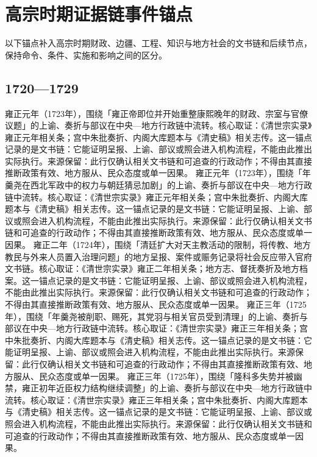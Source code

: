 \section{高宗时期证据链事件锚点}
以下锚点补入高宗时期财政、边疆、工程、知识与地方社会的文书链和后续节点，保持命令、条件、实施和影响之间的区分。
\subsection{1720—1729}
雍正元年（1723年），围绕「雍正帝即位并开始重整康熙晚年的财政、宗室与官僚议题」的上谕、奏折与部议在中央—地方行政链中流转。核心取证：《清世宗实录》雍正元年相关条；宫中朱批奏折、内阁大库题本与《清史稿》相关志传。这一锚点记录的是文书链：它能证明呈报、上谕、部议或照会进入机构流程，不能由此推出实际执行。来源保留：此行仅确认相关文书链和可追查的行政动作；不得由其直接推断政策有效、地方服从、民众态度或单一因果。
雍正元年（1723年），围绕「年羹尧在西北军政中的权力与朝廷猜忌加剧」的上谕、奏折与部议在中央—地方行政链中流转。核心取证：《清世宗实录》雍正元年相关条；宫中朱批奏折、内阁大库题本与《清史稿》相关志传。这一锚点记录的是文书链：它能证明呈报、上谕、部议或照会进入机构流程，不能由此推出实际执行。来源保留：此行仅确认相关文书链和可追查的行政动作；不得由其直接推断政策有效、地方服从、民众态度或单一因果。
雍正二年（1724年），围绕「清廷扩大对天主教活动的限制，将传教、地方教民与外来人员置入治理问题」的地方呈报、案件或赈务记录将社会反应带入官府文书链。核心取证：《清世宗实录》雍正二年相关条；地方志、督抚奏折及地方档案。这一锚点记录的是文书链：它能证明呈报、上谕、部议或照会进入机构流程，不能由此推出实际执行。来源保留：此行仅确认相关文书链和可追查的行政动作；不得由其直接推断政策有效、地方服从、民众态度或单一因果。
雍正三年（1725年），围绕「年羹尧被削职、赐死，其党羽与相关官员受到清理」的上谕、奏折与部议在中央—地方行政链中流转。核心取证：《清世宗实录》雍正三年相关条；宫中朱批奏折、内阁大库题本与《清史稿》相关志传。这一锚点记录的是文书链：它能证明呈报、上谕、部议或照会进入机构流程，不能由此推出实际执行。来源保留：此行仅确认相关文书链和可追查的行政动作；不得由其直接推断政策有效、地方服从、民众态度或单一因果。
雍正三年（1725年），围绕「隆科多失势并被幽禁，雍正初年近臣权力结构继续调整」的上谕、奏折与部议在中央—地方行政链中流转。核心取证：《清世宗实录》雍正三年相关条；宫中朱批奏折、内阁大库题本与《清史稿》相关志传。这一锚点记录的是文书链：它能证明呈报、上谕、部议或照会进入机构流程，不能由此推出实际执行。来源保留：此行仅确认相关文书链和可追查的行政动作；不得由其直接推断政策有效、地方服从、民众态度或单一因果。
